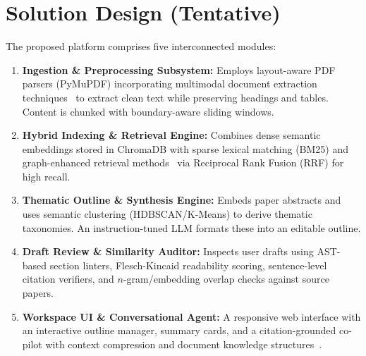 \documentclass[10pt,a4paper]{article}
\begin{document}
\section{Solution Design (Tentative)}
The proposed platform comprises five interconnected modules:
\begin{enumerate}
    \item \textbf{Ingestion \& Preprocessing Subsystem:} Employs layout-aware PDF parsers (PyMuPDF) incorporating multimodal document extraction techniques~\cite{joshi2024robust} to extract clean text while preserving headings and tables. Content is chunked with boundary-aware sliding windows.
    \item \textbf{Hybrid Indexing \& Retrieval Engine:} Combines dense semantic embeddings stored in ChromaDB with sparse lexical matching (BM25) and graph-enhanced retrieval methods~\cite{kamra2024enhancing} via Reciprocal Rank Fusion (RRF) for high recall.
    \item \textbf{Thematic Outline \& Synthesis Engine:} Embeds paper abstracts and uses semantic clustering (HDBSCAN/K-Means) to derive thematic taxonomies. An instruction-tuned LLM formats these into an editable outline.
    \item \textbf{Draft Review \& Similarity Auditor:} Inspects user drafts using AST-based section linters, Flesch-Kincaid readability scoring, sentence-level citation verifiers, and $n$-gram/embedding overlap checks against source papers.
    \item \textbf{Workspace UI \& Conversational Agent:} A responsive web interface with an interactive outline manager, summary cards, and a citation-grounded co-pilot with context compression and document knowledge structures~\cite{knollmeyer2024document}.
\end{enumerate}

\end{document}
